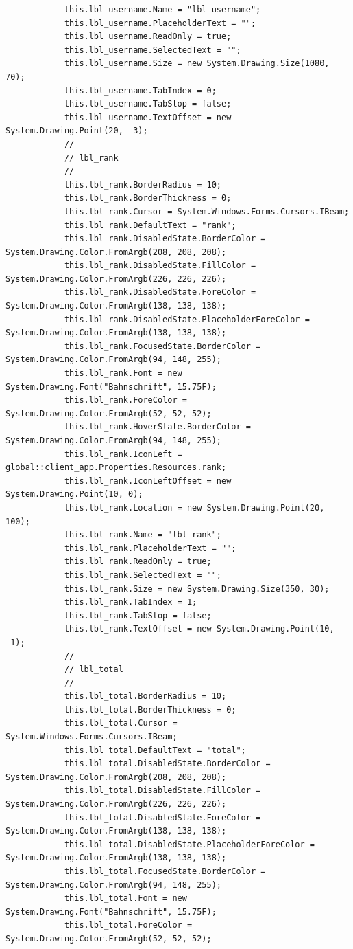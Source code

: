\documentclass{article}
\begin{document}
\begin{verbatim}
			this.lbl_username.Name = "lbl_username";
			this.lbl_username.PlaceholderText = "";
			this.lbl_username.ReadOnly = true;
			this.lbl_username.SelectedText = "";
			this.lbl_username.Size = new System.Drawing.Size(1080, 70);
			this.lbl_username.TabIndex = 0;
			this.lbl_username.TabStop = false;
			this.lbl_username.TextOffset = new System.Drawing.Point(20, -3);
			// 
			// lbl_rank
			// 
			this.lbl_rank.BorderRadius = 10;
			this.lbl_rank.BorderThickness = 0;
			this.lbl_rank.Cursor = System.Windows.Forms.Cursors.IBeam;
			this.lbl_rank.DefaultText = "rank";
			this.lbl_rank.DisabledState.BorderColor = System.Drawing.Color.FromArgb(208, 208, 208);
			this.lbl_rank.DisabledState.FillColor = System.Drawing.Color.FromArgb(226, 226, 226);
			this.lbl_rank.DisabledState.ForeColor = System.Drawing.Color.FromArgb(138, 138, 138);
			this.lbl_rank.DisabledState.PlaceholderForeColor = System.Drawing.Color.FromArgb(138, 138, 138);
			this.lbl_rank.FocusedState.BorderColor = System.Drawing.Color.FromArgb(94, 148, 255);
			this.lbl_rank.Font = new System.Drawing.Font("Bahnschrift", 15.75F);
			this.lbl_rank.ForeColor = System.Drawing.Color.FromArgb(52, 52, 52);
			this.lbl_rank.HoverState.BorderColor = System.Drawing.Color.FromArgb(94, 148, 255);
			this.lbl_rank.IconLeft = global::client_app.Properties.Resources.rank;
			this.lbl_rank.IconLeftOffset = new System.Drawing.Point(10, 0);
			this.lbl_rank.Location = new System.Drawing.Point(20, 100);
			this.lbl_rank.Name = "lbl_rank";
			this.lbl_rank.PlaceholderText = "";
			this.lbl_rank.ReadOnly = true;
			this.lbl_rank.SelectedText = "";
			this.lbl_rank.Size = new System.Drawing.Size(350, 30);
			this.lbl_rank.TabIndex = 1;
			this.lbl_rank.TabStop = false;
			this.lbl_rank.TextOffset = new System.Drawing.Point(10, -1);
			// 
			// lbl_total
			// 
			this.lbl_total.BorderRadius = 10;
			this.lbl_total.BorderThickness = 0;
			this.lbl_total.Cursor = System.Windows.Forms.Cursors.IBeam;
			this.lbl_total.DefaultText = "total";
			this.lbl_total.DisabledState.BorderColor = System.Drawing.Color.FromArgb(208, 208, 208);
			this.lbl_total.DisabledState.FillColor = System.Drawing.Color.FromArgb(226, 226, 226);
			this.lbl_total.DisabledState.ForeColor = System.Drawing.Color.FromArgb(138, 138, 138);
			this.lbl_total.DisabledState.PlaceholderForeColor = System.Drawing.Color.FromArgb(138, 138, 138);
			this.lbl_total.FocusedState.BorderColor = System.Drawing.Color.FromArgb(94, 148, 255);
			this.lbl_total.Font = new System.Drawing.Font("Bahnschrift", 15.75F);
			this.lbl_total.ForeColor = System.Drawing.Color.FromArgb(52, 52, 52);

\end{verbatim}
\end{document}
